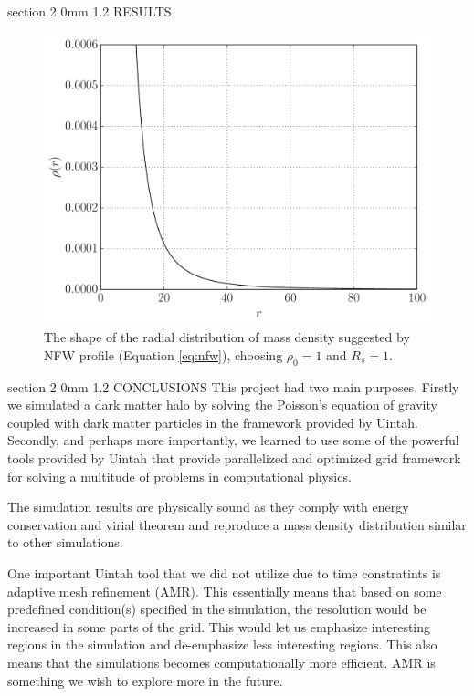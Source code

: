 \documentclass[notitlepage, 12pt]{article}
\makeatletter
\renewcommand{\section}{\@startsection       %
        {section}
        {2}
        {0mm}
        {1.2\baselineskip}
        {\baselineskip}
        {\centering\normalsize}}
\makeatother
\begin{document}
\section{RESULTS}
\begin{figure}[H]
\centering
\includegraphics[width=.8\textwidth]{NFW_profile.pdf}
\caption{The shape of the radial distribution of mass density suggested by NFW profile (Equation \ref{eq:nfw}), choosing $\rho_0=1$ and $R_s=1$.}
\label{fig:nfw}
\end{figure}
\section{CONCLUSIONS}
This project had two main purposes. Firstly we simulated a dark matter halo by solving the Poisson's equation of gravity coupled with dark matter particles in the framework provided by Uintah. Secondly, and perhaps more importantly, we learned to use some of the powerful tools provided by Uintah that provide parallelized and optimized grid framework for solving a multitude of problems in computational physics.

The simulation results are physically sound as they comply with energy conservation and virial theorem and reproduce a mass density distribution similar to other simulations.

One important Uintah tool that we did not utilize due to time constratints is adaptive mesh refinement (AMR). This essentially means that based on some predefined condition(s) specified in the simulation, the resolution would be increased in some parts of the grid. This would let us emphasize interesting regions in the simulation and de-emphasize less interesting regions. This also means that the simulations becomes computationally more efficient. AMR is something we wish to explore more in the future.
\end{document}
